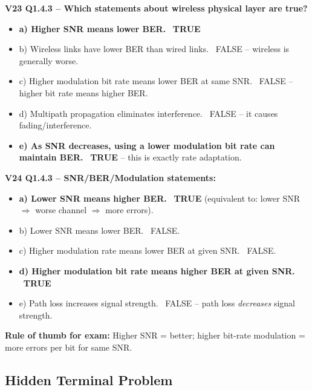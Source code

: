 \begin{exambox}
\textbf{V23 Q1.4.3 -- Which statements about wireless physical layer are true?}
\begin{itemize}[noitemsep]
    \item \textbf{a) Higher SNR means lower BER.} \checkmark\ \textbf{TRUE}
    \item b) Wireless links have lower BER than wired links. \texttimes\ FALSE -- wireless is generally worse.
    \item c) Higher modulation bit rate means lower BER at same SNR. \texttimes\ FALSE -- higher bit rate means higher BER.
    \item d) Multipath propagation eliminates interference. \texttimes\ FALSE -- it causes fading/interference.
    \item \textbf{e) As SNR decreases, using a lower modulation bit rate can maintain BER.} \checkmark\ \textbf{TRUE} -- this is exactly rate adaptation.
\end{itemize}

\medskip
\textbf{V24 Q1.4.3 -- SNR/BER/Modulation statements:}
\begin{itemize}[noitemsep]
    \item \textbf{a) Lower SNR means higher BER.} \checkmark\ \textbf{TRUE} (equivalent to: lower SNR $\Rightarrow$ worse channel $\Rightarrow$ more errors).
    \item b) Lower SNR means lower BER. \texttimes\ FALSE.
    \item c) Higher modulation rate means lower BER at given SNR. \texttimes\ FALSE.
    \item \textbf{d) Higher modulation bit rate means higher BER at given SNR.} \checkmark\ \textbf{TRUE}
    \item e) Path loss increases signal strength. \texttimes\ FALSE -- path loss \emph{decreases} signal strength.
\end{itemize}

\medskip
\textbf{Rule of thumb for exam:} Higher SNR = better; higher bit-rate modulation = more errors per bit for same SNR.
\end{exambox}

\subsection{Hidden Terminal Problem}

